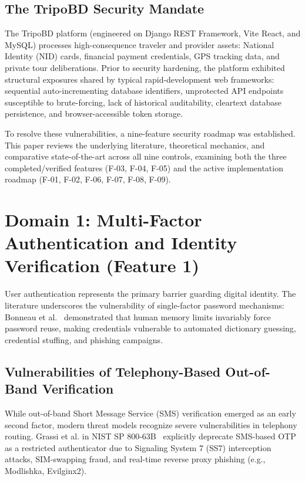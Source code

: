 \documentclass[10pt,twocolumn,a4paper]{article}
\begin{document}
\subsection{The TripoBD Security Mandate}
The TripoBD platform (engineered on Django REST Framework, Vite React, and MySQL) processes high-consequence traveler and provider assets: National Identity (NID) cards, financial payment credentials, GPS tracking data, and private tour deliberations. Prior to security hardening, the platform exhibited structural exposures shared by typical rapid-development web frameworks: sequential auto-incrementing database identifiers, unprotected API endpoints susceptible to brute-forcing, lack of historical auditability, cleartext database persistence, and browser-accessible token storage. 

To resolve these vulnerabilities, a nine-feature security roadmap was established. This paper reviews the underlying literature, theoretical mechanics, and comparative state-of-the-art across all nine controls, examining both the three completed/verified features (F-03, F-04, F-05) and the active implementation roadmap (F-01, F-02, F-06, F-07, F-08, F-09).

\section{Domain 1: Multi-Factor Authentication and Identity Verification (Feature 1)}
User authentication represents the primary barrier guarding digital identity. The literature underscores the vulnerability of single-factor password mechanisms: Bonneau et al.~\cite{bonneau2012quest} demonstrated that human memory limits invariably force password reuse, making credentials vulnerable to automated dictionary guessing, credential stuffing, and phishing campaigns.

\subsection{Vulnerabilities of Telephony-Based Out-of-Band Verification}
While out-of-band Short Message Service (SMS) verification emerged as an early second factor, modern threat models recognize severe vulnerabilities in telephony routing. Grassi et al. in NIST SP 800-63B~\cite{nist_sp800_63b} explicitly deprecate SMS-based OTP as a restricted authenticator due to Signaling System 7 (SS7) interception attacks, SIM-swapping fraud, and real-time reverse proxy phishing (e.g., Modlishka, Evilginx2).
\end{document}
